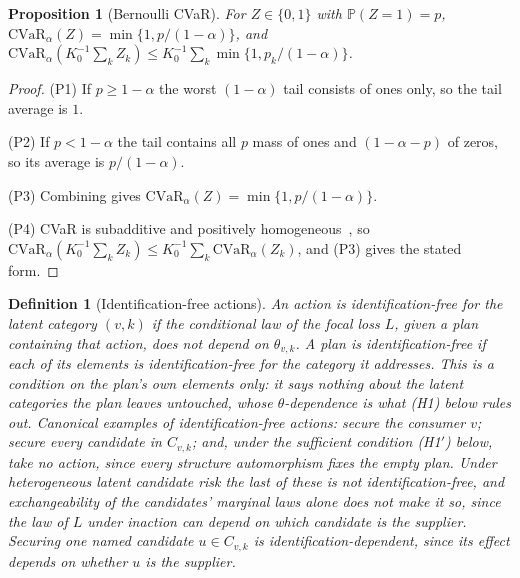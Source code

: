 \documentclass[pdflatex,sn-mathphys-num]{sn-jnl}
\theoremstyle{thmstyleone}
\newtheorem{proposition}[theorem]{Proposition}
\theoremstyle{thmstyletwo}
\theoremstyle{thmstylethree}
\newtheorem{definition}{Definition}
\newcommand{\cvar}{\mathrm{CVaR}}
\begin{document}
\begin{proposition}[Bernoulli CVaR]\label{prop:bern}
For $Z\in\{0,1\}$ with $\mathbb{P}(Z=1)=p$,
$\cvar_\alpha(Z)=\min\{1,p/(1-\alpha)\}$, and
$\cvar_\alpha(K_0^{-1}\sum_kZ_k)\le
K_0^{-1}\sum_k\min\{1,p_k/(1-\alpha)\}$.
\end{proposition}

\begin{proof}
(P1) If $p\ge1-\alpha$ the worst $(1-\alpha)$ tail consists of ones only, so
the tail average is $1$.

\noindent(P2) If $p<1-\alpha$ the tail contains all $p$ mass of ones and
$(1-\alpha-p)$ of zeros, so its average is $p/(1-\alpha)$.

\noindent(P3) Combining gives $\cvar_\alpha(Z)=\min\{1,p/(1-\alpha)\}$.

\noindent(P4) CVaR is subadditive and positively
homogeneous~\cite{artzner1999}, so
$\cvar_\alpha(K_0^{-1}\sum_kZ_k)\le K_0^{-1}\sum_k\cvar_\alpha(Z_k)$, and
(P3) gives the stated form.
\end{proof}

\begin{definition}[Identification-free actions]\label{def:free}
An action is \emph{identification-free} for the latent category $(v,k)$ if
the conditional law of the focal loss $L$, given a plan containing that
action, does not depend on $\theta_{v,k}$. A plan is
\emph{identification-free} if each of its elements is identification-free for
the category it addresses. This is a condition on the plan's own elements
only: it says nothing about the latent categories the plan leaves untouched,
whose $\theta$-dependence is what (H1) below rules out.
Canonical examples of identification-free actions:
secure the consumer $v$;
secure every candidate in $C_{v,k}$; and, under the sufficient condition
(H1$'$) below, take no action, since every structure automorphism fixes the
empty plan. Under heterogeneous latent candidate risk the last of these is not
identification-free, and exchangeability of the candidates' marginal laws
alone does not make it so, since the law of $L$ under inaction can depend on which
candidate is the supplier. Securing one named
candidate $u\in C_{v,k}$ is \emph{identification-dependent}, since its
effect depends on whether $u$ is the supplier.
\end{definition}
\end{document}

